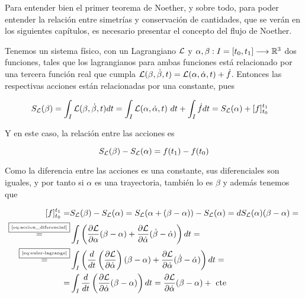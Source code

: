 Para entender bien el primer teorema de Noether, y sobre todo, para poder entender la relación entre simetrías y conservación de cantidades, que se verán en los siguientes capítulos, es necesario presentar el concepto del flujo de Noether.

Tenemos un sistema físico, con un Lagrangiano $\mathcal{L}$ y $\alpha,\beta:I=[t_0, t_1]\longrightarrow \mathbb{R}^3$ dos funciones, tales que los lagrangianos para ambas funciones está relacionado por una tercera función real que cumpla $\mathcal{L}(\beta, \dot{\beta}, t) = \mathcal{L}(\alpha, \dot{\alpha}, t)+\dot{f}$.
Entonces las respectivas acciones están relacionadas por una constante, pues

\begin{equation}
	\label{eq:variacion-accion}
	\begin{split}
		S_\lagrangiano(\beta) & = \int_I \lagrangiano(\beta, \dot{\beta}, t) dt = \int_I \lagrangiano(\alpha, \dot{\alpha}, t)\ dt+\int_I \dot{f}dt=S_\lagrangiano(\alpha) +[f]_{t_0}^{t_1}
	\end{split}
\end{equation}

Y en este caso, la relación entre las acciones es

\begin{equation}
	\label{eq:variacion-accion-relacion}
	S_{\mathcal{L}}(\beta) - S_{\mathcal{L}}(\alpha) = f(t_1) - f(t_0)
\end{equation}

Como la diferencia entre las acciones es una constante, sus diferenciales son iguales, y por tanto si $\alpha$ es una trayectoria, también lo es $\beta$ y además tenemos que

\begin{equation}
	\label{eq:diferencial_trayectoria}
	\begin{split}
	[f]
		_{t_0}^{t_1} = & S_{\mathcal{L}}(\beta) - S_{\mathcal{L}}(\alpha) = S_{\mathcal{L}}(\alpha + (\beta-\alpha))-S_{\mathcal{L}}(\alpha)=dS_{\mathcal{L}}(\alpha)(\beta-\alpha)=\\
		\overset{\fbox{\tiny \ref{eq:accion_diferencial}}}{=} & \int_{I}\left( \frac{\partial \mathcal{L}}{\partial\alpha}(\beta-\alpha)+\frac{\partial \mathcal{L}}{\partial\dot{\alpha}}(\dot{\beta}-\dot{\alpha})\right) dt = \\
		\overset{\fbox{\tiny \ref{eq:euler-lagrange}}}{=} & \int_{I}\left( \frac{d}{dt}\left(\frac{\partial \mathcal{L}}{\partial\dot{\alpha}}\right)(\beta-\alpha)+\frac{\partial \mathcal{L}}{\partial\dot{\alpha}}(\dot{\beta}-\dot{\alpha})\right) dt=\\
		= & \int_{I}\frac{d}{dt}\left(\frac{\partial \mathcal{L}}{\partial\dot{\alpha}}(\beta-\alpha)\right) dt = \frac{\partial \mathcal{L}}{\partial\dot{\alpha}}(\beta-\alpha) + \text{ cte }
	\end{split}
\end{equation}

